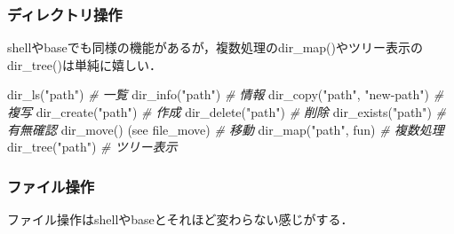 \documentclass[
]{article}
\newenvironment{Shaded}{\begin{snugshade}}{\end{snugshade}}
\newcommand{\CommentTok}[1]{\textcolor[rgb]{0.56,0.35,0.01}{\textit{#1}}}
\newcommand{\FunctionTok}[1]{\textcolor[rgb]{0.00,0.00,0.00}{#1}}
\newcommand{\NormalTok}[1]{#1}
\newcommand{\StringTok}[1]{\textcolor[rgb]{0.31,0.60,0.02}{#1}}
\begin{document}
\hypertarget{ux30c7ux30a3ux30ecux30afux30c8ux30eaux64cdux4f5c}{%
\subsubsection{ディレクトリ操作}\label{ux30c7ux30a3ux30ecux30afux30c8ux30eaux64cdux4f5c}}

shellやbaseでも同様の機能があるが，複数処理のdir\_map()やツリー表示のdir\_tree()は単純に嬉しい．

\begin{Shaded}
\begin{Highlighting}[]
\FunctionTok{dir\_ls}\NormalTok{(}\StringTok{"path"}\NormalTok{) }\CommentTok{\# 一覧   }
\FunctionTok{dir\_info}\NormalTok{(}\StringTok{"path"}\NormalTok{) }\CommentTok{\# 情報   }
\FunctionTok{dir\_copy}\NormalTok{(}\StringTok{"path"}\NormalTok{, }\StringTok{"new{-}path"}\NormalTok{) }\CommentTok{\# 複写   }
\FunctionTok{dir\_create}\NormalTok{(}\StringTok{"path"}\NormalTok{) }\CommentTok{\# 作成   }
\FunctionTok{dir\_delete}\NormalTok{(}\StringTok{"path"}\NormalTok{) }\CommentTok{\# 削除   }
\FunctionTok{dir\_exists}\NormalTok{(}\StringTok{"path"}\NormalTok{) }\CommentTok{\# 有無確認   }
\FunctionTok{dir\_move}\NormalTok{() (see file\_move) }\CommentTok{\# 移動   }
\FunctionTok{dir\_map}\NormalTok{(}\StringTok{"path"}\NormalTok{, fun) }\CommentTok{\# 複数処理   }
\FunctionTok{dir\_tree}\NormalTok{(}\StringTok{"path"}\NormalTok{) }\CommentTok{\# ツリー表示   }
\end{Highlighting}
\end{Shaded}

\hypertarget{ux30d5ux30a1ux30a4ux30ebux64cdux4f5c}{%
\subsubsection{ファイル操作}\label{ux30d5ux30a1ux30a4ux30ebux64cdux4f5c}}

ファイル操作はshellやbaseとそれほど変わらない感じがする．
\end{document}
